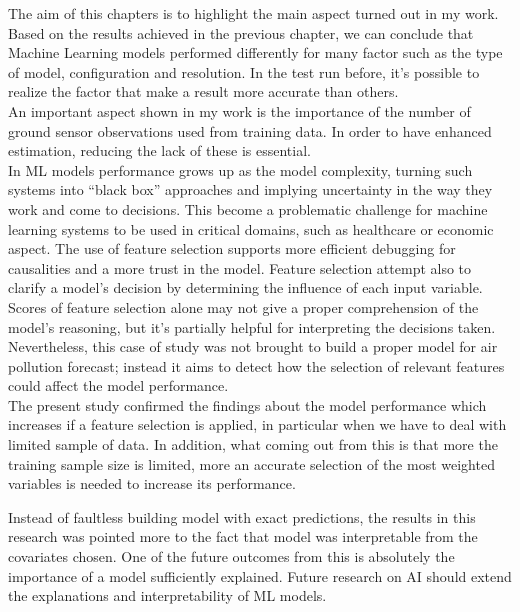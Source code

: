 The aim of this chapters is to highlight the main aspect turned out in my work.
Based on the results achieved in the previous chapter, we can conclude that Machine Learning models performed differently for many factor such as the type of model, configuration and resolution.
In the test run before, it's possible to realize the factor that make a result more accurate than others.\\
An important aspect shown in my work is the importance of the number of ground sensor observations used from training data. In order to have enhanced estimation, reducing the lack of these is essential.\\
In ML models performance grows up as the model complexity, turning such systems into “black box” approaches and implying uncertainty in the way they work and come to decisions. 
This become a problematic challenge for machine learning systems to be used in critical domains, such as healthcare or economic aspect.
The use of feature selection supports more efficient debugging for causalities and a more trust in the model.
Feature selection attempt also to clarify a model’s decision by determining the influence of each input variable. 
Scores of feature selection alone may not give a proper comprehension of the model’s reasoning, but it's partially helpful for interpreting the decisions taken.\\
Nevertheless, this case of study was not brought to build a proper model for air pollution forecast; instead it aims to detect how the selection of relevant features could affect the model performance. \\
The present study confirmed the findings about the model performance which increases if a feature selection is applied, in particular when we have to deal with limited sample of data\cite{vabalas2019machine}. 
In addition, what coming out from this is that more the training sample size is limited, more an accurate selection of the most weighted variables is needed to increase its performance.
\begin{comment}
In this work so it's highlighted the effect of how the training in ML should benefit from an accurate selection of variable. 
\end{comment}
Instead of faultless building model with exact predictions, the results in this research was pointed more to the fact that model was interpretable from the covariates chosen. 
One of the future outcomes from this is absolutely the importance of a model sufficiently explained.
Future research on AI should extend the explanations and interpretability of ML models.
